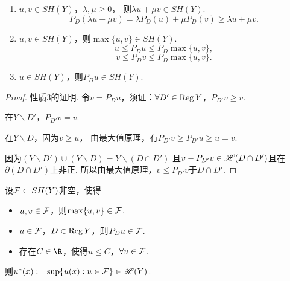 \begin{proposition}[次调和函数的一些性质]
	\begin{enumerate}
		\item[1.] $u,v\in SH(Y)$，$\lambda,\mu \geq 0$，
        则$\lambda u+\mu v \in SH(Y)$.
		$$P_D(\lambda u+\mu v)=\lambda P_D(u)+\mu P_D(v) \geq \lambda u+\mu v.$$
		\item[2.] $u,v\in SH(Y)$，则$\max\{u,v\}\in SH(Y)$. 
		$$u\leq P_Du\leq P_D\max\{u,v\},$$
		$$v\leq P_Dv\leq P_D\max\{u,v\}.$$
		\item[3.] $u\in SH(Y)$，则$P_D u\in SH(Y)$.
	\end{enumerate}
\end{proposition}
		
\begin{proof}
	性质3的证明. 令$v=P_D u$，须证：$\forall D'\in \operatorname{Reg} Y$，$P_{D'} v\geq v$.

	在$Y\backslash D'$，$P_{D'} v=v$.

	在$Y\backslash D$，因为$v\geq u$，
    由最大值原理，有$P_{D'} v \geq P_{D'} u\geq u=v$.

	因为$(Y\backslash D')\cup (Y\backslash D)=Y\backslash (D\cap D')$
    且$v-P_{D'}v\in \mathscr{H}(D\cap D')$且在$\partial (D\cap D')$上非正. 
    所以由最大值原理，$v\leq P_{D'}v$于$D\cap D'$.
\end{proof}

\begin{lemma}[Perron]
	设$\mathcal{F} \subset SH(Y)$非空，使得
	\begin{itemize}
		\item[1.] $u,v\in \mathcal{F}$，则$\max\{u,v\} \in \mathcal{F}$.
		\item[2.] $u\in \mathcal{F}$，$D\in \operatorname{Reg} Y$，则$P_Du \in \mathcal{F}$.
		\item[3.] 存在$C\in \R$，使得$u\leq C$，$\forall u\in \mathcal{F}$.
	\end{itemize}
	则$u^*(x):=\sup\{u(x): u\in \mathcal{F}\} \in \mathscr{H}(Y)$.
\end{lemma}

